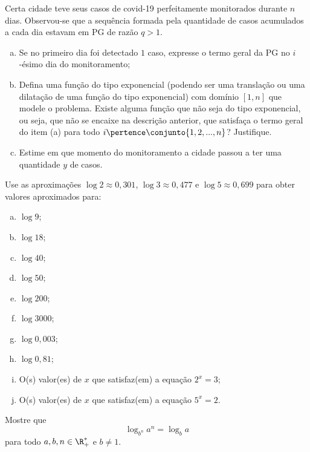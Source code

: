 \begin{exercise}
    Certa cidade teve seus casos de covid-19 perfeitamente monitorados durante $n$ dias. Observou-se que a sequência formada pela quantidade de casos acumulados a cada dia estavam em PG de razão $q>1$.
     \begin{enumerate}[a)]
        \item Se no primeiro dia foi detectado $1$ caso, expresse o termo geral da PG no $i$-ésimo dia do monitoramento;
        \item Defina uma função do tipo exponencial (podendo ser uma translação ou uma dilatação de uma função do tipo exponencial) com domínio $[1, n]$ que modele o problema. Existe alguma função que não seja do tipo exponencial, ou seja, que não se encaixe na descrição anterior, que satisfaça o termo geral do item (a) para todo $i \pertence \conjunto{1, 2, ..., n}$? Justifique.
        \item Estime em que momento do monitoramento a cidade passou a ter uma quantidade $y$ de casos.
    \end{enumerate}
\end{exercise}

\begin{exercise}
    Use as aproximações $\log 2 \approx 0,301$, $\log 3 \approx
0,477$ e $\log 5 \approx 0,699$ para obter valores aproximados para:
\begin{enumerate}[a)]
  \item $\log 9$;
  \item $\log18$;
  \item $\log 40$;
  \item $\log50$;
  \item $\log 200$;
  \item $\log 3000$;
  \item $\log 0{,}003$;
  \item $\log 0{,}81$;
  \item O(s) valor(es) de $x$ que satisfaz(em) a equação $2^x=3$;
  \item O(s) valor(es) de $x$ que satisfaz(em) a equação $5^x=2$.
\end{enumerate}
\end{exercise}

\begin{exercise}
    Mostre que $$\log_{b^n}a^n = \log_{b}a$$ para todo $a, b, n \in \R_+^\ast $ e $b\neq 1$.
\end{exercise}


